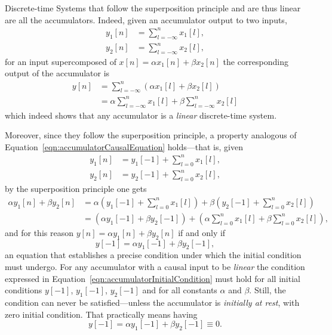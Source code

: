 \documentclass[\documentfontsize, twocolumn]{\classname}
\begin{document}
Discrete-time Systems that follow the superposition principle and are thus linear are all the accumulators. Indeed, given an accumulator output to two inputs,
\begin{align*}
    y_1[n] &= \sum_{l=-\infty}^n x_1[l], \\
    y_2[n] &= \sum_{l=-\infty}^n x_2[l],
\end{align*}
for an input supercomposed of $x[n] = \alpha x_1[n] + \beta x_2[n]$ the corresponding output of the accumulator is
\begin{align*}
    y[n] &= \sum_{l=-\infty}^n (\alpha x_1[l] + \beta x_2[l]) \\
         &= \alpha\sum_{l=-\infty}^n x_1[l] + \beta\sum_{l=-\infty}^n x_2[l]
\end{align*}
which indeed shows that any accumulator is a \emph{linear} discrete-time system.

Moreover, since they follow the superposition principle, a property analogous of Equation~\ref{eqn:accumulatorCausalEquation} holds---that is, given
\begin{align*}
    y_1[n] &= y_1[-1] + \sum_{l=0}^n x_1[l], \\
    y_2[n] &= y_2[-1] + \sum_{l=0}^n x_2[l],
\end{align*}
by the superposition principle one gets
\begin{align*}
    \alpha y_1[n] + \beta y_2[n]  &= \alpha ( y_1[-1] + \sum_{l=0}^n x_1[l]) + \beta ( y_2[-1] + \sum_{l=0}^n x_2[l])\\
                                  &= (\alpha y_1[-1] + \beta y_2[-1]) + (\alpha\sum_{l=0}^n x_1[l] + \beta\sum_{l=0}^n x_2[l]),
\end{align*}
and for this reason $y[n] = \alpha y_1[n] + \beta y_2[n]$ if and only if
\begin{equation}\label{eqn:accumulatorInitialCondition}
    y[-1] = \alpha y_1[-1] + \beta y_2[-1],
\end{equation}
an equation that establishes a precise condition under which the initial condition must undergo. For any accumulator with a causal input to be \emph{linear} the condition expressed in Equation~\ref{eqn:accumulatorInitialCondition} must hold for all initial conditions $y[-1]$, $y_1[-1]$, $y_2[-1]$ and for all constants $\alpha$ and $\beta$. Still, the condition can never be satisfied---unless the accumulator is \emph{initially at rest}, with zero initial condition. That practically means having
\[
    y[-1] = \alpha y_1[-1] + \beta y_2[-1] \equiv 0.
\]
\end{document}
